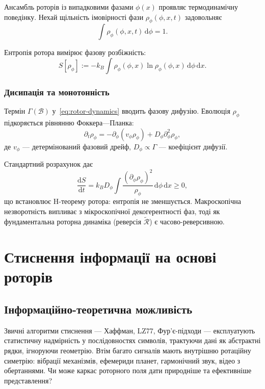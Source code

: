 \documentclass[11pt,a4paper]{article}
\newcommand{\rev}[1]{\widetilde{#1}}           %
\newcommand{\Rotor}{\mathcal{R}}
\newcommand{\Biv}{\mathcal{B}}
\theoremstyle{definition}
\theoremstyle{plain}
\theoremstyle{remark}
\begin{document}
Ансамбль роторів із випадковими фазами $\phi(x)$ проявляє термодинамічну поведінку. Нехай щільність імовірності фази $\rho_\phi(\phi,x,t)$ задовольняє
\begin{equation}
\int \rho_\phi(\phi,x,t)\, \mathrm{d}\phi = 1.
\end{equation}

Ентропія ротора вимірює фазову розбіжність:
\begin{equation}
S[\rho_\phi] := -k_B \int \rho_\phi(\phi,x) \ln \rho_\phi(\phi,x)\, \mathrm{d}\phi\, \mathrm{d}x.
\end{equation}

\subsubsection{Дисипація та монотонність}

Термін $\Gamma(\Biv)$ у~\eqref{eq:rotor-dynamics} вводить фазову дифузію. Еволюція $\rho_\phi$ підкоряється рівнянню Фоккера—Планка:
\begin{equation}
\partial_t \rho_\phi = -\partial_\phi\!\left(v_\phi \rho_\phi\right) + D_\phi \partial_\phi^2 \rho_\phi,
\end{equation}
де $v_\phi$ — детермінований фазовий дрейф, $D_\phi \propto \Gamma$ — коефіцієнт дифузії.

Стандартний розрахунок дає
\begin{equation}
\frac{\mathrm{d}S}{\mathrm{d}t} = k_B D_\phi \int \frac{(\partial_\phi \rho_\phi)^2}{\rho_\phi}\, \mathrm{d}\phi\, \mathrm{d}x \geq 0,
\end{equation}
що встановлює H-теорему ротора: ентропія не зменшується. Макроскопічна незворотність випливає з мікроскопічної декогерентності фаз, тоді як фундаментальна роторна динаміка (реверсія $\rev{\Rotor}$) є часово-реверсивною.

\vspace{1em}

\section{Стиснення інформації на основі роторів}\label{sec:compression}

\subsection{Інформаційно-теоретична можливість}

Звичні алгоритми стиснення — Хаффман, LZ77, Фур’є-підходи — експлуатують статистичну надмірність у послідовностях символів, трактуючи дані як абстрактні рядки, ігноруючи геометрію. Втім багато сигналів мають внутрішню ротаційну симетрію: вібрації механізмів, ефемериди планет, гармонічний звук, відео з обертаннями. Чи може каркас роторного поля дати природніше та ефективніше представлення?
\end{document}
